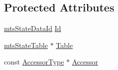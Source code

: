 \subsection*{Protected Attributes}
\begin{DoxyCompactItemize}
\item 
\hyperlink{mts_state_table_8h_ac3a0e34e8991d51790b043fa01857a35}{mts\-State\-Data\-Id} \hyperlink{classmts_state_data_ae5f3c63391a2375ab7f58d1c99bd8521}{Id}
\item 
\hyperlink{classmts_state_table}{mts\-State\-Table} $\ast$ \hyperlink{classmts_state_data_a8933fedc828fdc64dedb258260be5e4a}{Table}
\item 
const \hyperlink{classmts_state_data_a21eb9a3d0093820221159ffd63fa9616}{Accessor\-Type} $\ast$ \hyperlink{classmts_state_data_a41e425be145f2a83a7386a783d3db35c}{Accessor}
\end{DoxyCompactItemize}


